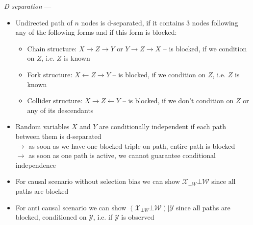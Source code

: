 \emph{D separation} --- 
\begin{itemize}
    \item Undirected path of $n$ nodes is d-separated, if it contains 3 nodes following any of the following forms and if this form is blocked: 
    \begin{itemize}
        \item Chain structure: $X \rightarrow Z \rightarrow Y$ or $Y \rightarrow Z \rightarrow X$ – is blocked, if we condition on $Z$, i.e. $Z$ is known
        \item Fork structure: $X \leftarrow Z \rightarrow Y$ – is blocked, if we condition on $Z$, i.e. $Z$ is known
        \item Collider structure: $X \rightarrow Z \leftarrow Y$ – is blocked, if we don't condition on $Z$ or any of its descendants
    \end{itemize}
    \item Random variables $X$ and $Y$ are conditionally independent if each path between them is d-separated\\
    $\rightarrow$ as soon as we have one blocked triple on path, entire path is blocked\\
    $\rightarrow$ as soon as one path is active, we cannot guarantee conditional independence
    \item For causal scenario without selection bias we can show $\mathcal{X}_{\bot W} \bot \mathcal{W}$ since all paths are blocked 
    \item For anti causal scenario we can show $(\mathcal{X}_{\bot W} \bot \mathcal{W}) | \mathcal{Y}$ since all paths are blocked, conditioned on $\mathcal{Y}$, i.e. if $\mathcal{Y}$ is observed
\end{itemize}